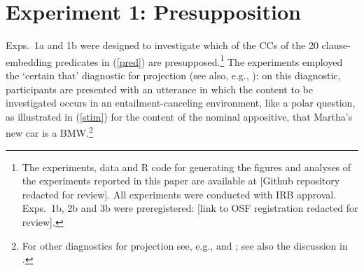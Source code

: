 \documentclass[11pt,fleqn]{article}
\newcommand{\6}{\mbox{$[\hspace*{-.6mm}[$}}
\newcommand{\9}{\mbox{$]\hspace*{-.6mm}]$}}
\begin{document}


%
%
%
%


\section{Experiment 1: Presupposition}\label{s2}

Exps.~1a and 1b were designed to investigate which of the CCs of the 20 clause-embedding predicates in (\ref{pred}) are presupposed.\footnote{\label{f-github}The experiments, data and R code for generating the figures and analyses of the experiments reported in this paper are available at [Github repository redacted for review]. All experiments were conducted with IRB approval. Exps.~1b, 2b and 3b were preregistered: [link to OSF registration redacted for review].}
The experiments employed the `certain that' diagnostic for projection (see also, e.g., \citealt{tonhauser-salt26,djaerv-bacovcin-salt27,stevens-etal2017,lorson2018,tbd-variability,mahler-nels,mahler2020,demarneffe-etal-sub23}): on this diagnostic, participants are presented with an utterance in which the content to be investigated occurs in an entailment-canceling environment, like a polar question, as illustrated in (\ref{stim}) for the content of the nominal appositive, that Martha's new car is a BMW.\footnote{For other diagnostics for projection see, e.g., \citealt{smith-hall11,xue-onea11} and \citealt{brst-lang11}; see also the discussion in \citealt{tbd-variability}.} 
\end{document}
